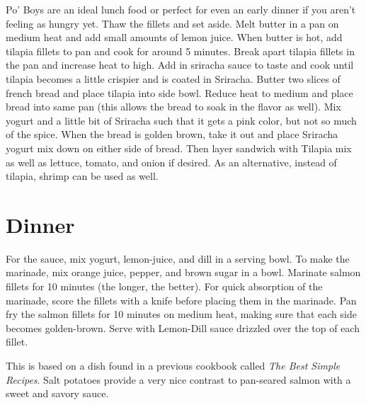 \documentclass[oneside]{recipe}
\begin{document}
Po' Boys are an ideal lunch food or perfect for even an early dinner if you aren't feeling as hungry yet. Thaw the fillets and set aside. Melt butter in a pan on medium heat and add small amounts of lemon juice. When butter is hot, add tilapia fillets to pan and cook for around 5 minutes. Break apart tilapia fillets in the pan and increase heat to high. Add in sriracha sauce to taste and cook until tilapia becomes a little crispier and is coated in Sriracha. Butter two slices of french bread and place tilapia into side bowl. Reduce heat to medium and place bread into same pan (this allows the bread to soak in the flavor as well). Mix yogurt and a little bit of Sriracha such that it gets a pink color, but not so much of the spice. When the bread is golden brown, take it out and place Sriracha yogurt mix down on either side of bread. Then layer sandwich with Tilapia mix as well as lettuce, tomato, and onion if desired. As an alternative, instead of tilapia, shrimp can be used as well. 

\chapter{Dinner}

For the sauce, mix yogurt, lemon-juice, and dill in a serving bowl. 
To make the marinade, mix orange juice, pepper, and brown sugar in a bowl. Marinate salmon fillets for 10 minutes (the longer, the better). For quick absorption of the marinade, score the fillets with a knife before placing them in the marinade. 
Pan fry the salmon fillets for 10 minutes on medium heat, making sure that each side becomes golden-brown. Serve with Lemon-Dill sauce drizzled over the top of each fillet. 

This is based on a dish found in a previous cookbook called \textit{The Best Simple Recipes}. Salt potatoes provide a very nice contrast to pan-seared salmon with a sweet and savory sauce.  






\end{document}
